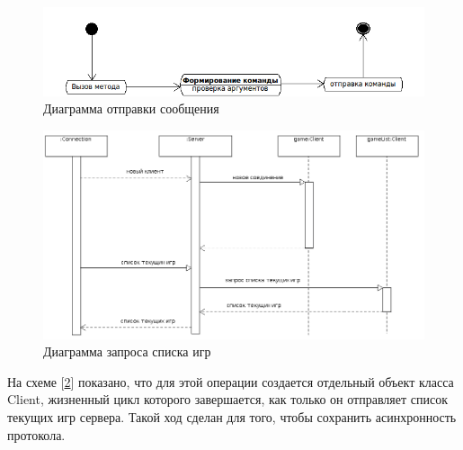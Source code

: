 \begin{figure}[ht]
\centering
\includegraphics[width=18cm]{images/state1.png}
\caption{Диаграмма отправки сообщения}
\label{fig6}
\end{figure}

\begin{figure}[hpt]
\centering
\includegraphics[width=18cm]{images/par2.png}
\caption{Диаграмма запроса списка игр}
\label{fig7}
\end{figure}

На схеме [\ref{fig7}] показано, что для этой операции создается отдельный объект класса Client, жизненный цикл которого завершается, как только он отправляет список текущих игр сервера. Такой ход сделан для того, чтобы сохранить асинхронность протокола.

\endinput
